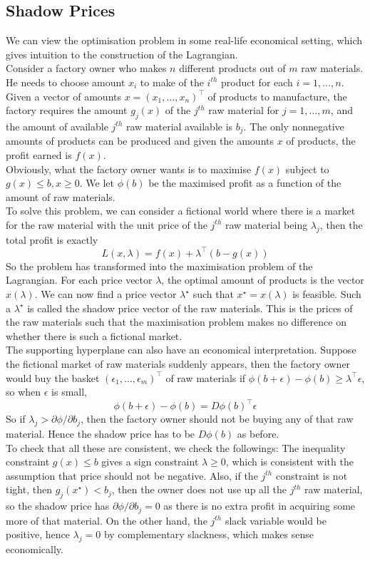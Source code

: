 \subsection{Shadow Prices}
We can view the optimisation problem in some real-life economical setting, which gives intuition to the construction of the Lagrangian.\\
Consider a factory owner who makes $n$ different products out of $m$ raw materials.
He needs to choose amount $x_i$ to make of the $i^{th}$ product for each $i=1,\ldots,n$.
Given a vector of amounts $x=(x_1,\ldots,x_n)^\top$ of products to manufacture, the factory requires the amount $g_j(x)$ of the $j^{th}$ raw material for $j=1,\ldots,m$, and the amount of available $j^{th}$ raw material available is $b_j$.
The only nonnegative amounts of products can be produced and given the amounts $x$ of products, the profit earned is $f(x)$.\\
Obviously, what the factory owner wants is to maximise $f(x)$ subject to $g(x)\le b,x\ge 0$.
We let $\phi(b)$ be the maximised profit as a function of the amount of raw materials.\\
To solve this problem, we can consider a fictional world where there is a market for the raw material with the unit price of the $j^{th}$ raw material being $\lambda_j$, then the total profit is exactly
$$L(x,\lambda)=f(x)+\lambda^\top(b-g(x))$$
So the problem has transformed into the maximisation problem of the Lagrangian.
For each price vector $\lambda$, the optimal amount of products is the vector $x(\lambda)$.
We can now find a price vector $\lambda^\star$ such that $x^\star=x(\lambda)$ is feasible.
Such a $\lambda^\star$ is called the shadow price vector of the raw materials.
This is the prices of the raw materials such that the maximisation problem makes no difference on whether there is such a fictional market.\\
The supporting hyperplane can also have an economical interpretation.
Suppose the fictional market of raw materials suddenly appears, then the factory owner would buy the basket $(\epsilon_1,\ldots,\epsilon_m)^\top$ of raw materials if $\phi(b+\epsilon)-\phi(b)\ge\lambda^\top\epsilon$, so when $\epsilon$ is small,
$$\phi(b+\epsilon)-\phi(b)=D\phi(b)^\top\epsilon$$
So if $\lambda_j>\partial\phi/\partial b_j$, then the factory owner should not be buying any of that raw material.
Hence the shadow price has to be $D\phi(b)$ as before.\\
To check that all these are consistent, we check the followings:
The inequality constraint $g(x)\le b$ gives a sign constraint $\lambda\ge 0$, which is consistent with the assumption that price should not be negative.
Also, if the $j^{th}$ constraint is not tight, then $g_j(x^\star)<b_j$, then the owner does not use up all the $j^{th}$ raw material, so the shadow price has $\partial\phi/\partial b_j=0$ as there is no extra profit in acquiring some more of that material.
On the other hand, the $j^{th}$ slack variable would be positive, hence $\lambda_j=0$ by complementary slackness, which makes sense economically.
